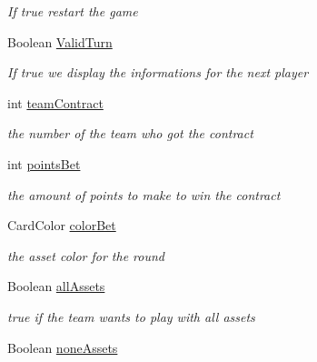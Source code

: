 \begin{DoxyCompactItemize}
\begin{DoxyCompactList}\small\item\em If true restart the game \end{DoxyCompactList}\item 
Boolean \hyperlink{class_coinche_1_1_tools_1_1_game_info_ad8e4babf051a6eb82792190097b50582}{Valid\+Turn}
\begin{DoxyCompactList}\small\item\em If true we display the informations for the next player \end{DoxyCompactList}\item 
int \hyperlink{class_coinche_1_1_tools_1_1_game_info_ae516bdeec5b6602e12319890bbf4ee0c}{team\+Contract}
\begin{DoxyCompactList}\small\item\em the number of the team who got the contract \end{DoxyCompactList}\item 
int \hyperlink{class_coinche_1_1_tools_1_1_game_info_acac3b4e483a564843e32ca5f7313cfb7}{points\+Bet}
\begin{DoxyCompactList}\small\item\em the amount of points to make to win the contract \end{DoxyCompactList}\item 
Card\+Color \hyperlink{class_coinche_1_1_tools_1_1_game_info_ad547c22e23833dbd7833726d3a03da60}{color\+Bet}
\begin{DoxyCompactList}\small\item\em the asset color for the round \end{DoxyCompactList}\item 
Boolean \hyperlink{class_coinche_1_1_tools_1_1_game_info_ab9f5ff2748e7a1059254408b8c591886}{all\+Assets}
\begin{DoxyCompactList}\small\item\em true if the team wants to play with all assets \end{DoxyCompactList}\item 
Boolean \hyperlink{class_coinche_1_1_tools_1_1_game_info_a23fc3472540fb1bd3e8f93d441b4d11b}{none\+Assets}

\end{DoxyCompactItemize}
